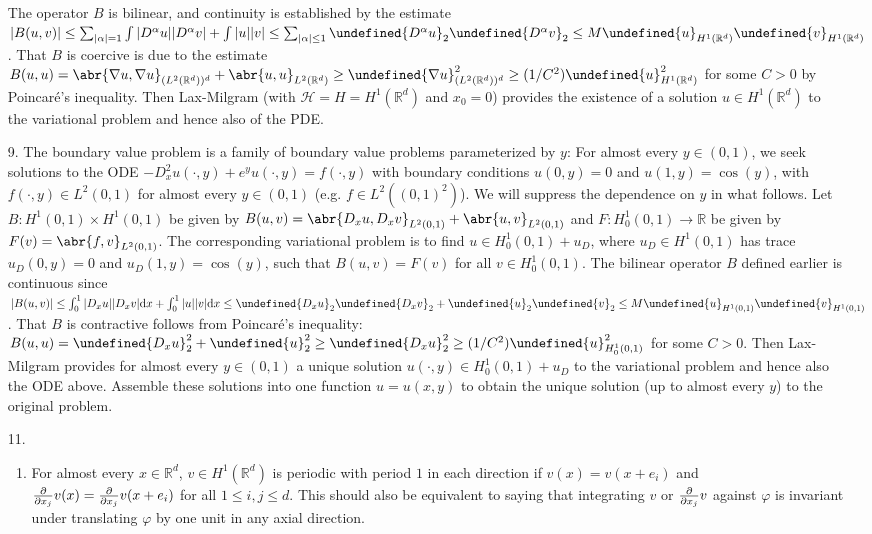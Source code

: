 \documentclass[11pt,leqno]{article}
\theoremstyle{plain}
\theoremstyle{definition}
\numberwithin{equation}{section}
\numberwithin{lem}{section}
\let\norm\undefined %
\DeclarePairedDelimiter\norm{\lVert}{\rVert}
\begin{document}
\begin{enumerate}
    The operator $B$ is bilinear, and continuity is established by the estimate $\abs{B(u,v)} \leq \sum_{\abs{\alpha} = 1}\int\abs{D^\alpha u}\abs{D^\alpha v} + \int\abs{u}\abs{v}\leq \sum_{\abs{\alpha}\leq 1}\norm{D^\alpha u}_2\norm{D^\alpha v}_2\leq M\norm{u}_{H^1(\mathbb R^d)}\norm{v}_{H^1(\mathbb R^d)}$. That $B$ is coercive is due to the estimate $B(u,u) = \abr{\nabla u,\nabla u}_{(L^2(\mathbb R^d))^d} + \abr{u,u}_{L^2(\mathbb R^d)}\geq \norm{\nabla u}_{(L^2(\mathbb R^d))^d}^2 \geq (1/C^2)\norm{u}_{H^1(\mathbb R^d)}^2$ for some $C>0$ by Poincar\'e's inequality. Then Lax-Milgram (with $\mathcal H = H = H^1(\mathbb R^d)$ and $x_0 = 0$) provides the existence of a solution $u\in H^1(\mathbb R^d)$ to the variational problem and hence also of the PDE.
    \item[9.] The boundary value problem is a family of boundary value problems parameterized by $y$: For almost every $y\in (0,1)$, we seek solutions to the ODE $-D^2_xu(\cdot,y)+e^yu(\cdot,y) = f(\cdot,y)$ with boundary conditions $u(0,y) = 0$ and $u(1,y) = \cos(y)$, with $f(\cdot,y)\in L^2(0,1)$ for almost every $y\in (0,1)$ (e.g. $f\in L^2((0,1)^2)$). We will suppress the dependence on $y$ in what follows. Let $B\colon H^1(0,1)\times H^1(0,1)$ be given by $B(u,v) = \abr{D_xu,D_xv}_{L^2(0,1)} + \abr{u,v}_{L^2(0,1)}$ and $F\colon H^1_0(0,1)\to\mathbb R$ be given by $F(v) = \abr{f,v}_{L^2(0,1)}$. The corresponding variational problem is to find $u\in H^1_0(0,1) + u_D$, where $u_D\in H^1(0,1)$ has trace $u_D(0,y) = 0$ and $u_D(1,y) = \cos(y)$, such that $B(u,v) = F(v)$ for all $v\in H^1_0(0,1)$. The bilinear operator $B$ defined earlier is continuous since $\abs{B(u,v)}\leq \int_0^1\abs{D_xu}\abs{D_xv}\dd x + \int_0^1\abs{u}\abs{v}\dd x\leq \norm{D_xu}_2\norm{D_xv}_2 + \norm{u}_2\norm{v}_2\leq M\norm{u}_{H^1(0,1)}\norm{v}_{H^1(0,1)}$. That $B$ is contractive follows from Poincar\'e's inequality: $B(u,u) = \norm{D_xu}_2^2 + \norm{u}_2^2\geq \norm{D_xu}_2^2\geq (1/C^2)\norm{u}_{H^1_0(0,1)}^2$ for some $C>0$. Then Lax-Milgram provides for almost every $y\in (0,1)$ a unique solution $u(\cdot,y)\in H^1_0(0,1) + u_D$ to the variational problem and hence also the ODE above. Assemble these solutions into one function $u = u(x,y)$ to obtain the unique solution (up to almost every $y$) to the original problem.
    \item[11.] \begin{enumerate}
        \item For almost every $x\in \mathbb R^d$, $v\in H^1(\mathbb R^d)$ is periodic with period $1$ in each direction if $v(x) = v(x+e_i)$ and $\pdv{x_j}v(x) =\pdv{x_j}v(x+e_i)$ for all $1\leq i,j\leq d$. This should also be equivalent to saying that integrating $v$ or $\pdv{x_j}v$ against $\varphi$ is invariant under translating $\varphi$ by one unit in any axial direction.

\end{enumerate}
\end{enumerate}
\end{document}
